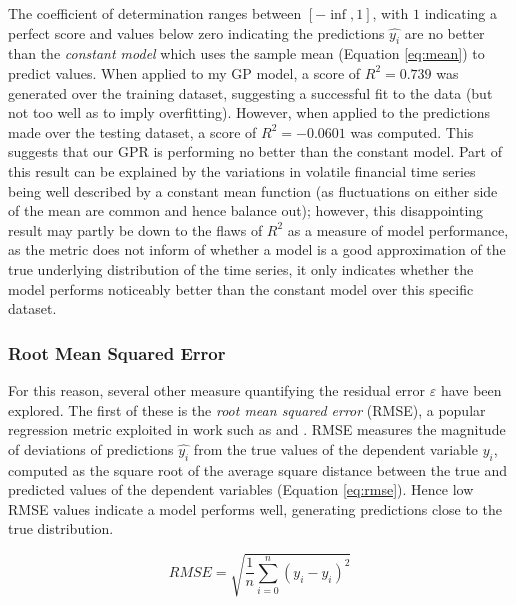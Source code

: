 \documentclass[a4paper, 11pt]{article}
\begin{document}
    The coefficient of determination ranges between $[-\inf, 1]$, with $1$ indicating a perfect score and values below zero indicating the predictions $\hat{y_i}$ are no better than the \emph{constant model} which uses the sample mean (Equation \ref{eq:mean}) to predict values. When applied to my GP model, a score of $R^2 = 0.739$ was generated over the training dataset, suggesting a successful fit to the data (but not too well as to imply overfitting). However, when applied to the predictions made over the testing dataset, a score of $R^2 = -0.0601$ was computed. This suggests that our GPR is performing no better than the constant model. Part of this result can be explained by the variations in volatile financial time series being well described by a constant mean function (as fluctuations on either side of the mean are common and hence balance out); however, this disappointing result may partly be down to the flaws of $R^2$ as a measure of model performance, as the metric does not inform of whether a model is a good approximation of the true underlying distribution of the time series, it only indicates whether the model performs noticeably better than the constant model over this specific dataset.

    \subsubsection{Root Mean Squared Error}

    For this reason, several other measure quantifying the residual error $\varepsilon$ have been explored. The first of these is the \emph{root mean squared error} (RMSE), a popular regression metric exploited in work such as  and . RMSE measures the magnitude of deviations of predictions $\hat{y_i}$ from the true values of the dependent variable $y_i$, computed as the square root of the average square distance between the true and predicted values of the dependent variables (Equation \ref{eq:rmse}). Hence low RMSE values indicate a model performs well, generating predictions close to the true distribution.

    \begin{equation}
        RMSE = \sqrt{\frac{1}{n} \sum_{i=0}^n (y_i - \hat{y_i})^2}
        \label{eq:rmse}
    \end{equation}
\end{document}
